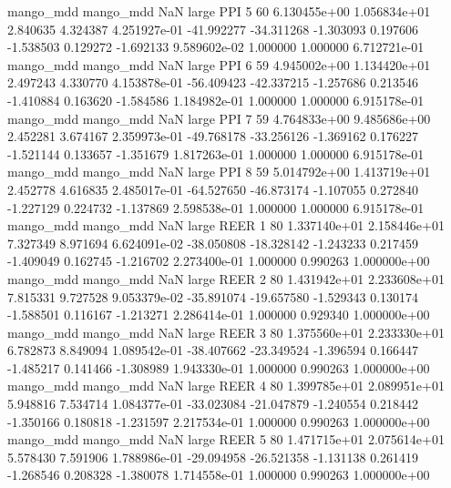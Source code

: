 mango_mdd mango_mdd                   NaN      large      PPI                 5 60 6.130455e+00   1.056834e+01      2.840635       4.324387  4.251927e-01    -41.992277    -34.311268    -1.303093       0.197606 -1.538503   0.129272    -1.692133   9.589602e-02            1.000000        1.000000        6.712721e-01
mango_mdd mango_mdd                   NaN      large      PPI                 6 59 4.945002e+00   1.134420e+01      2.497243       4.330770  4.153878e-01    -56.409423    -42.337215    -1.257686       0.213546 -1.410884   0.163620    -1.584586   1.184982e-01            1.000000        1.000000        6.915178e-01
mango_mdd mango_mdd                   NaN      large      PPI                 7 59 4.764833e+00   9.485686e+00      2.452281       3.674167  2.359973e-01    -49.768178    -33.256126    -1.369162       0.176227 -1.521144   0.133657    -1.351679   1.817263e-01            1.000000        1.000000        6.915178e-01
mango_mdd mango_mdd                   NaN      large      PPI                 8 59 5.014792e+00   1.413719e+01      2.452778       4.616835  2.485017e-01    -64.527650    -46.873174    -1.107055       0.272840 -1.227129   0.224732    -1.137869   2.598538e-01            1.000000        1.000000        6.915178e-01
mango_mdd mango_mdd                   NaN      large     REER                 1 80 1.337140e+01   2.158446e+01      7.327349       8.971694  6.624091e-02    -38.050808    -18.328142    -1.243233       0.217459 -1.409049   0.162745    -1.216702   2.273400e-01            1.000000        0.990263        1.000000e+00
mango_mdd mango_mdd                   NaN      large     REER                 2 80 1.431942e+01   2.233608e+01      7.815331       9.727528  9.053379e-02    -35.891074    -19.657580    -1.529343       0.130174 -1.588501   0.116167    -1.213271   2.286414e-01            1.000000        0.929340        1.000000e+00
mango_mdd mango_mdd                   NaN      large     REER                 3 80 1.375560e+01   2.233330e+01      6.782873       8.849094  1.089542e-01    -38.407662    -23.349524    -1.396594       0.166447 -1.485217   0.141466    -1.308989   1.943330e-01            1.000000        0.990263        1.000000e+00
mango_mdd mango_mdd                   NaN      large     REER                 4 80 1.399785e+01   2.089951e+01      5.948816       7.534714  1.084377e-01    -33.023084    -21.047879    -1.240554       0.218442 -1.350166   0.180818    -1.231597   2.217534e-01            1.000000        0.990263        1.000000e+00
mango_mdd mango_mdd                   NaN      large     REER                 5 80 1.471715e+01   2.075614e+01      5.578430       7.591906  1.788986e-01    -29.094958    -26.521358    -1.131138       0.261419 -1.268546   0.208328    -1.380078   1.714558e-01            1.000000        0.990263        1.000000e+00
